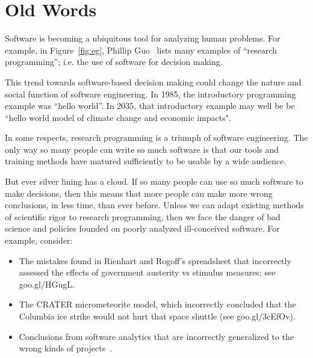 \documentclass[journal]{IEEEtran}
\newcommand{\bi}{\begin{itemize}}
\newcommand{\ei}{\end{itemize}}
\begin{document}
% 
 




\balance





\section{Old Words}
Software is becoming  a ubiquitous tool
for analyzing human problems.
For example, in  Figure~\ref{fig:eg},
Phillip Guo~\cite{guo12} lists many examples of ``research programming''; i.e. the use of software for 
decision making.

This trend towards software-based decision making could change the nature and social function of software engineering.
In 1985, the introductory programming example was ``hello world''.  
In 2035, that introductory example
may well be be ``hello world model of climate change and economic
impacts". 


In some respects,  research programming is a triumph of software engineering.
The only way so many people can write so much software is that   our  tools and training methods have matured sufficiently to be usable by a wide audience.  
 
But ever silver lining has a cloud. If so many people can use so much software to make decisions, then this means that more
people can make more wrong conclusions, in less time, than
ever before. Unless we can adapt existing methods of scientific rigor   to research programming, then we face the danger of bad science and   policies founded on  poorly analyzed ill-conceived software. For
example, consider:
\bi\item The mistakes found in Rienhart and Rogoff's spreadsheet that incorrectly assessed the
effects of  government  austerity   vs stimulus measures; see  goo.gl/HGugL.  
\item
The CRATER  micrometeorite  model, which  incorrectly
concluded that the Columbia  ice strike would not hurt that space shuttle (see goo.gl/3cEfOv).
\item Conclusions from software analytics that
are incorrectly generalized to the wrong kinds of projects~\cite{shull02}.
\ei
\end{document}
